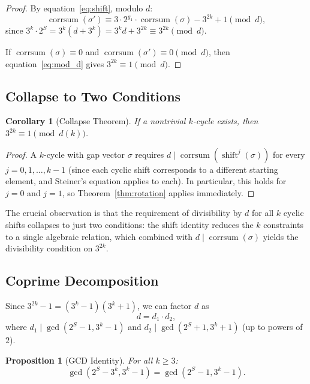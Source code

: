 \documentclass[12pt,a4paper]{amsart}
\theoremstyle{plain}
\newtheorem{proposition}[theorem]{Proposition}
\newtheorem{corollary}[theorem]{Corollary}
\theoremstyle{definition}
\newcommand{\corrsum}{\operatorname{corrsum}}
\newcommand{\shift}{\operatorname{shift}}
\renewcommand{\gcd}{\operatorname{gcd}}
\begin{document}
\begin{proof}
By equation~\eqref{eq:shift}, modulo $d$:
\begin{equation}
\label{eq:mod_d}
\corrsum(\sigma') \equiv 3 \cdot 2^{g_1} \cdot \corrsum(\sigma) - 3^{2k} + 1 \pmod{d},
\end{equation}
since $3^k \cdot 2^S = 3^k(d + 3^k) = 3^k d + 3^{2k} \equiv 3^{2k} \pmod{d}$.

If $\corrsum(\sigma) \equiv 0$ and $\corrsum(\sigma') \equiv 0 \pmod{d}$, then equation~\eqref{eq:mod_d} gives $3^{2k} \equiv 1 \pmod{d}$.
\end{proof}

\subsection{Collapse to Two Conditions}

\begin{corollary}[Collapse Theorem]
\label{cor:collapse}
If a nontrivial $k$-cycle exists, then $3^{2k} \equiv 1 \pmod{d(k)}$.
\end{corollary}

\begin{proof}
A $k$-cycle with gap vector $\sigma$ requires $d \mid \corrsum(\shift^j(\sigma))$ for every $j = 0, 1, \ldots, k-1$ (since each cyclic shift corresponds to a different starting element, and Steiner's equation applies to each). In particular, this holds for $j = 0$ and $j = 1$, so Theorem~\ref{thm:rotation} applies immediately.
\end{proof}

The crucial observation is that the requirement of divisibility by $d$ for all $k$ cyclic shifts collapses to just two conditions: the shift identity reduces the $k$ constraints to a single algebraic relation, which combined with $d \mid \corrsum(\sigma)$ yields the divisibility condition on $3^{2k}$.

\subsection{Coprime Decomposition}

Since $3^{2k} - 1 = (3^k - 1)(3^k + 1)$, we can factor $d$ as
\[
d = d_1 \cdot d_2,
\]
where $d_1 \mid \gcd(2^S - 1, 3^k - 1)$ and $d_2 \mid \gcd(2^S + 1, 3^k + 1)$ (up to powers of $2$).

\begin{proposition}[GCD Identity]
\label{prop:gcd}
For all $k \geq 3$:
\[
\gcd(2^S - 3^k, 3^k - 1) = \gcd(2^S - 1, 3^k - 1).
\]
\end{proposition}
\end{document}

